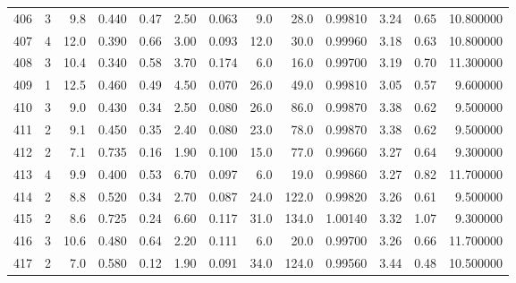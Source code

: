 \begin{tabular}{lrrrrrrrrrrrr}
406  &        3 &            9.8 &             0.440 &         0.47 &            2.50 &      0.063 &                  9.0 &                  28.0 &  0.99810 &  3.24 &       0.65 &  10.800000 \\
407  &        4 &           12.0 &             0.390 &         0.66 &            3.00 &      0.093 &                 12.0 &                  30.0 &  0.99960 &  3.18 &       0.63 &  10.800000 \\
408  &        3 &           10.4 &             0.340 &         0.58 &            3.70 &      0.174 &                  6.0 &                  16.0 &  0.99700 &  3.19 &       0.70 &  11.300000 \\
409  &        1 &           12.5 &             0.460 &         0.49 &            4.50 &      0.070 &                 26.0 &                  49.0 &  0.99810 &  3.05 &       0.57 &   9.600000 \\
410  &        3 &            9.0 &             0.430 &         0.34 &            2.50 &      0.080 &                 26.0 &                  86.0 &  0.99870 &  3.38 &       0.62 &   9.500000 \\
411  &        2 &            9.1 &             0.450 &         0.35 &            2.40 &      0.080 &                 23.0 &                  78.0 &  0.99870 &  3.38 &       0.62 &   9.500000 \\
412  &        2 &            7.1 &             0.735 &         0.16 &            1.90 &      0.100 &                 15.0 &                  77.0 &  0.99660 &  3.27 &       0.64 &   9.300000 \\
413  &        4 &            9.9 &             0.400 &         0.53 &            6.70 &      0.097 &                  6.0 &                  19.0 &  0.99860 &  3.27 &       0.82 &  11.700000 \\
414  &        2 &            8.8 &             0.520 &         0.34 &            2.70 &      0.087 &                 24.0 &                 122.0 &  0.99820 &  3.26 &       0.61 &   9.500000 \\
415  &        2 &            8.6 &             0.725 &         0.24 &            6.60 &      0.117 &                 31.0 &                 134.0 &  1.00140 &  3.32 &       1.07 &   9.300000 \\
416  &        3 &           10.6 &             0.480 &         0.64 &            2.20 &      0.111 &                  6.0 &                  20.0 &  0.99700 &  3.26 &       0.66 &  11.700000 \\
417  &        2 &            7.0 &             0.580 &         0.12 &            1.90 &      0.091 &                 34.0 &                 124.0 &  0.99560 &  3.44 &       0.48 &  10.500000 \\

\end{tabular}

